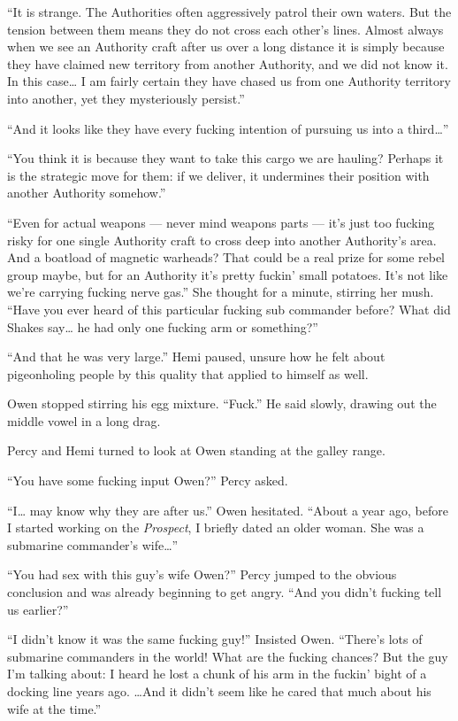 \documentclass[
]{scrbook}
\begin{document}
``It is strange. The Authorities often aggressively patrol their own
waters. But the tension between them means they do not cross each
other's lines. Almost always when we see an Authority craft after us
over a long distance it is simply because they have claimed new
territory from another Authority, and we did not know it. In this
case\ldots{} I am fairly certain they have chased us from one Authority
territory into another, yet they mysteriously persist.''

``And it looks like they have every fucking intention of pursuing us
into a third\ldots{}''

``You think it is because they want to take this cargo we are hauling?
Perhaps it is the strategic move for them: if we deliver, it undermines
their position with another Authority somehow.''

``Even for actual weapons --- never mind weapons parts --- it's just too
fucking risky for one single Authority craft to cross deep into another
Authority's area. And a boatload of magnetic warheads? That could be a
real prize for some rebel group maybe, but for an Authority it's pretty
fuckin' small potatoes. It's not like we're carrying fucking nerve
gas.'' She thought for a minute, stirring her mush. ``Have you ever
heard of this particular fucking sub commander before? What did Shakes
say\ldots{} he had only one fucking arm or something?''

``And that he was very large.'' Hemi paused, unsure how he felt about
pigeonholing people by this quality that applied to himself as well.

Owen stopped stirring his egg mixture. ``Fuck.'' He said slowly, drawing
out the middle vowel in a long drag.

Percy and Hemi turned to look at Owen standing at the galley range.

``You have some fucking input Owen?'' Percy asked.

``I\ldots{} may know why they are after us.'' Owen hesitated. ``About a
year ago, before I started working on the \emph{Prospect}, I briefly
dated an older woman. She was a submarine commander's wife\ldots{}''

``You had sex with this guy's wife Owen?'' Percy jumped to the obvious
conclusion and was already beginning to get angry. ``And you didn't
fucking tell us earlier?''

``I didn't know it was the same fucking guy!'' Insisted Owen. ``There's
lots of submarine commanders in the world! What are the fucking chances?
But the guy I'm talking about: I heard he lost a chunk of his arm in the
fuckin' bight of a docking line years ago. \ldots And it didn't seem
like he cared that much about his wife at the time.''
\end{document}
